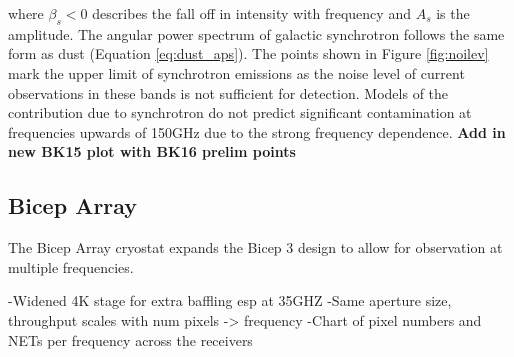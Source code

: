 \documentclass[12pt]{article}
\begin{document}
where $\beta _s < 0$ describes the fall off in intensity with frequency and
$A_s$ is the amplitude. The angular power spectrum of galactic synchrotron
follows the same form as dust (Equation \ref{eq:dust_aps}). The points shown
in Figure \ref{fig:noilev} mark the upper limit of synchrotron emissions as
the noise level of current observations in these bands is not sufficient for
detection. Models of the contribution due to synchrotron do not predict
significant contamination at frequencies upwards of 150GHz due to the strong
frequency dependence.
\textbf{Add in new BK15 plot with BK16 prelim points}


\subsection{Bicep Array}

The Bicep Array cryostat expands the Bicep 3 design to allow for observation
at multiple frequencies. 


-Widened 4K stage for extra baffling esp at 35GHZ
-Same aperture size, throughput scales with num pixels -> frequency
-Chart of pixel numbers and NETs per frequency across the receivers

\printbibliography
\end{document}
